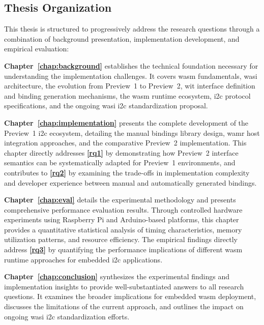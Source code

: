 \subsection{Thesis Organization}
\label{subsec:thesis-organization}

This thesis is structured to progressively address the research questions through a combination of background presentation, implementation development, and empirical evaluation:

\textbf{Chapter~\ref{chap:background}} establishes the technical foundation necessary for understanding the implementation challenges. It covers \acrshort{wasm} fundamentals, \acrshort{wasi} architecture, the evolution from Preview~1 to Preview~2, \acrshort{wit} interface definition and binding generation mechanisms, the \acrshort{wasm} runtime ecosystem, \acrshort{i2c} protocol specifications, and the ongoing \acrshort{wasi} \acrshort{i2c} standardization proposal.

\textbf{Chapter~\ref{chap:implementation}} presents the complete development of the Preview~1 \acrshort{i2c} ecosystem, detailing the manual bindings library design, \acrshort{wamr} host integration approaches, and the comparative Preview~2 implementation. This chapter directly addresses \textbf{\autoref{rq1}} by demonstrating how Preview~2 interface semantics can be systematically adapted for Preview~1 environments, and contributes to \textbf{\autoref{rq2}} by examining the trade-offs in implementation complexity and developer experience between manual and automatically generated bindings.

\textbf{Chapter~\ref{chap:eval}} details the experimental methodology and presents comprehensive performance evaluation results. Through controlled hardware experiments using Raspberry Pi and Arduino-based platforms, this chapter provides a quantitative statistical analysis of timing characteristics, memory utilization patterns, and resource efficiency. The empirical findings directly address \textbf{\autoref{rq3}} by quantifying the performance implications of different \acrshort{wasm} runtime approaches for embedded \acrshort{i2c} applications.

\textbf{Chapter~\ref{chap:conclusion}} synthesizes the experimental findings and implementation insights to provide well-substantiated answers to all research questions. It examines the broader implications for embedded \acrshort{wasm} deployment, discusses the limitations of the current approach, and outlines the impact on ongoing \acrshort{wasi} \acrshort{i2c} standardization efforts.


